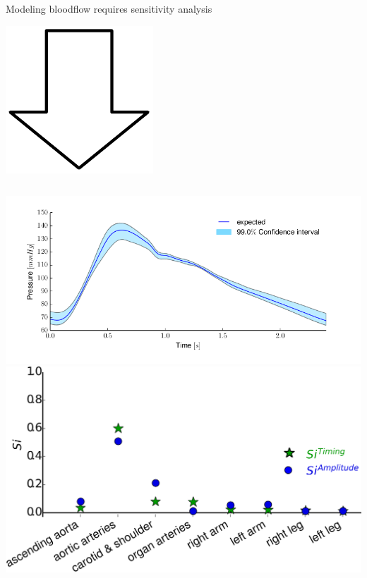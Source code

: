 \documentclass{beamer}
\begin{document}
\begin{frame}{Modeling bloodflow requires sensitivity analysis}{}
\begin{center}
    \includegraphics[width=.1\textwidth]{figures/south.pdf}
    \end{center}
    \begin{columns}
        \includegraphics[width=\textwidth]{ntnu/AorticPressure_parameterUncertainty.png}
        \includegraphics[width=\textwidth]{ntnu/results/sensitivity-pointOfinflection.png}
    \end{columns}
    \end{frame}
\end{document}
